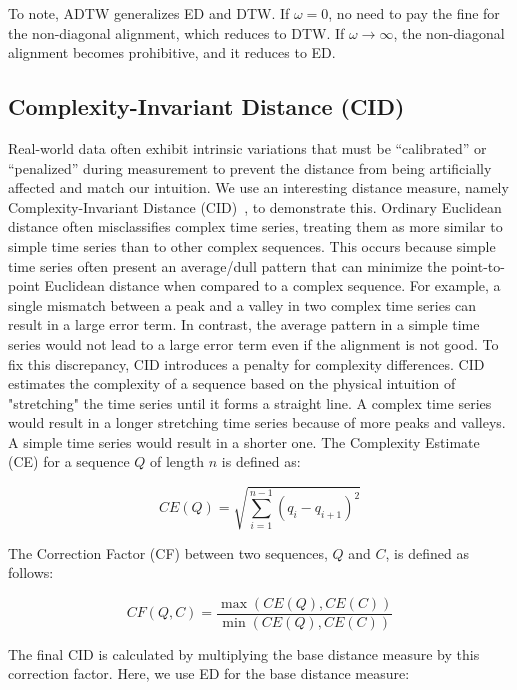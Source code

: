 To note, ADTW generalizes ED and DTW.
If $\omega = 0$, no need to pay the fine for the non-diagonal alignment, which reduces to DTW.
If $\omega \rightarrow \infty$, the non-diagonal alignment becomes prohibitive, and it reduces to ED.

\subsection{Complexity-Invariant Distance (CID)} %

Real-world data often exhibit intrinsic variations that must be ``calibrated'' or ``penalized'' during measurement to prevent the distance from being artificially affected and match our intuition. 
%
We use an interesting distance measure, namely Complexity-Invariant Distance (CID)~\cite{batista2014cid}, to demonstrate this.
%
Ordinary Euclidean distance often misclassifies complex time series, treating them as more similar to simple time series than to other complex sequences. 
%
This occurs because simple time series often present an average/dull pattern that can minimize the point-to-point Euclidean distance when compared to a complex sequence. 
%
For example, a single mismatch between a peak and a valley in two complex time series can result in a large error term.
In contrast, the average pattern in a simple time series would not lead to a large error term even if the alignment is not good.
%
To fix this discrepancy, CID introduces a penalty for complexity differences.
CID estimates the complexity of a sequence based on the physical intuition of "stretching" the time series until it forms a straight line.
A complex time series would result in a longer stretching time series because of more peaks and valleys.
A simple time series would result in a shorter one.
The Complexity Estimate (CE) for a sequence $Q$ of length $n$ is defined as:

\begin{equation}
    CE(Q) = \sqrt{\sum_{i=1}^{n-1}(q_{i} - q_{i+1})^2}
\end{equation}

The Correction Factor (CF) between two sequences, $Q$ and $C$, is defined as follows:

\begin{equation}
    CF(Q,C) = \frac{\max(CE(Q), CE(C))}{\min(CE(Q), CE(C))}
\end{equation}

The final CID is calculated by multiplying the base distance measure by this correction factor. Here, we use ED for the base distance measure:

